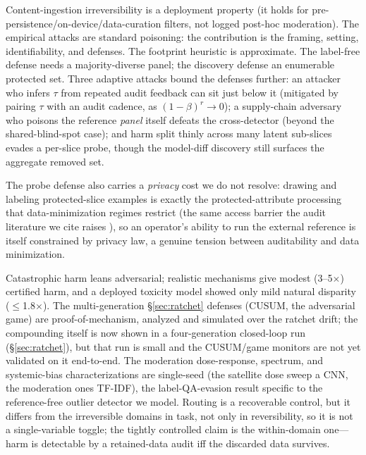 \documentclass[conference]{IEEEtran}
\begin{document}
Content-ingestion irreversibility is a deployment property (it holds for
pre-persistence/on-device/data-curation filters, not logged post-hoc moderation). The empirical attacks are
standard poisoning: the contribution is the framing, setting, identifiability, and defenses. The footprint heuristic
is approximate. The label-free defense needs a majority-diverse panel; the discovery defense an enumerable
protected set. Three adaptive attacks bound the defenses further: an attacker who infers $\tau$ from repeated
audit feedback can sit just below it (mitigated by pairing $\tau$ with an audit cadence, as $(1-\beta)^r\!\to\!0$);
a supply-chain adversary who poisons the reference \emph{panel} itself defeats the cross-detector (beyond the
shared-blind-spot case); and harm split thinly across many latent sub-slices evades a per-slice probe, though
the model-diff discovery still surfaces the aggregate removed set.

The probe defense also carries a
\emph{privacy} cost we do not resolve: drawing and labeling protected-slice examples is exactly the
protected-attribute processing that data-minimization regimes restrict (the same access barrier the audit
literature we cite raises \cite{zaccour2025}), so an operator's ability to run the external
reference is itself constrained by privacy law, a genuine tension between auditability and data minimization.

Catastrophic harm leans adversarial; realistic mechanisms give modest (3--5$\times$) certified
harm, and a deployed toxicity model showed only mild natural disparity ($\leq$1.8$\times$). The multi-generation
\S\ref{sec:ratchet} defenses (CUSUM, the adversarial game) are proof-of-mechanism, analyzed and simulated over the
ratchet drift; the compounding itself is now shown in a four-generation closed-loop run (\S\ref{sec:ratchet}),
but that run is small and the CUSUM/game monitors are not yet validated on it end-to-end. The moderation dose-response, spectrum, and
systemic-bias characterizations are single-seed (the satellite dose sweep a CNN, the moderation ones TF-IDF), the label-QA-evasion result specific to the reference-free
outlier detector we model. Routing is a
recoverable control, but it differs from the irreversible domains in task, not only in reversibility, so it is
not a single-variable toggle; the tightly controlled claim is the within-domain one---harm is detectable by a
retained-data audit iff the discarded data survives.
\end{document}
